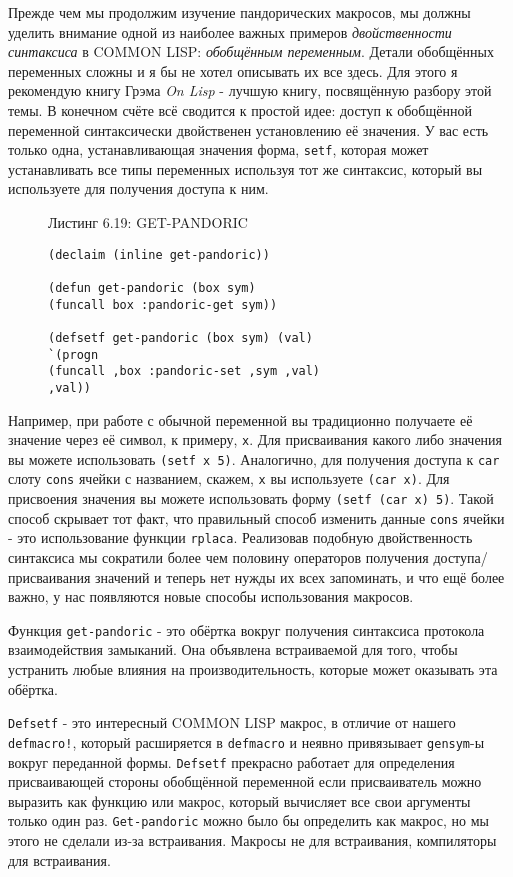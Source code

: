 Прежде чем мы продолжим изучение пандорических макросов, мы должны уделить внимание одной из наиболее важных примеров \emph{двойственности синтаксиса} в COMMON LISP: \emph{обобщённым переменным}. Детали обобщённых переменных сложны и я бы не хотел описывать их все здесь. Для этого я рекомендую книгу Грэма \emph{On Lisp} - лучшую книгу, посвящённую разбору этой темы. В конечном счёте всё сводится к простой идее: доступ к обобщённой переменной синтаксически двойственен установлению её значения. У вас есть только одна, устанавливающая значения форма, \verb"setf", которая может устанавливать все типы переменных используя тот же синтаксис, который вы используете для получения доступа к ним.

\begin{figure}Листинг 6.19: GET-PANDORIC\label{listing_6.19}
\listbegin
\begin{verbatim}
(declaim (inline get-pandoric))

(defun get-pandoric (box sym)
(funcall box :pandoric-get sym))

(defsetf get-pandoric (box sym) (val)
`(progn
(funcall ,box :pandoric-set ,sym ,val)
,val))
\end{verbatim}
\listend
\end{figure}

Например, при работе с обычной переменной вы традиционно получаете её значение через её символ, к примеру, \verb"x". Для присваивания какого либо значения вы можете использовать \verb"(setf x 5)". Аналогично, для получения доступа к \verb"car" слоту \verb"cons" ячейки с названием, скажем, \verb"x" вы используете \verb"(car x)". Для присвоения значения вы можете использовать форму \verb"(setf (car x) 5)". Такой способ скрывает тот факт, что правильный способ изменить данные \verb"cons" ячейки - это использование функции \verb"rplaca". Реализовав подобную двойственность синтаксиса мы сократили более чем половину операторов получения доступа/присваивания значений и теперь нет нужды их всех запоминать, и что ещё более важно, у нас появляются новые способы использования макросов.

Функция \verb"get-pandoric" - это обёртка вокруг получения синтаксиса протокола взаимодействия замыканий. Она объявлена встраиваемой для того, чтобы устранить любые влияния на производительность, которые может оказывать эта обёртка.

\verb"Defsetf" - это интересный COMMON LISP макрос, в отличие от нашего \verb"defmacro!", который расширяется в \verb"defmacro" и неявно привязывает \verb"gensym"-ы вокруг переданной формы. \verb"Defsetf" прекрасно работает для определения присваивающей стороны обобщённой переменной если присваиватель можно выразить как функцию или макрос, который вычисляет все свои аргументы только один раз. \verb"Get-pandoric" можно было бы определить как макрос, но мы этого не сделали из-за встраивания. Макросы не для встраивания, компиляторы для встраивания.

